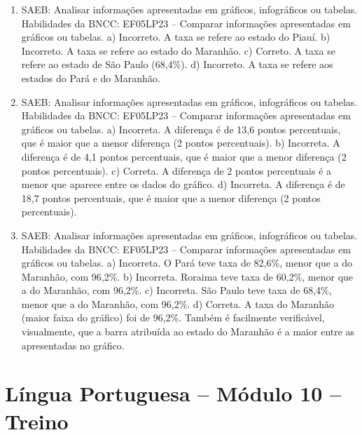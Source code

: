 \begin{enumerate}
\item
SAEB: Analisar informações apresentadas em gráficos,
infográficos ou tabelas. Habilidades da BNCC: EF05LP23 – Comparar
informações apresentadas em gráficos ou tabelas.
a) Incorreto. A taxa se refere ao estado do Piauí.
b) Incorreto. A taxa se refere ao estado do Maranhão.
c) Correto. A taxa se refere ao estado de São Paulo (68,4\%).
d) Incorreto. A taxa se refere aos estados do Pará e do Maranhão.

\item
SAEB: Analisar informações apresentadas em gráficos,
infográficos ou tabelas. Habilidades da BNCC: EF05LP23 – Comparar
informações apresentadas em gráficos ou tabelas.
a) Incorreta. A diferença é de 13,6 pontos percentuais, que é maior que a menor diferença (2 pontos percentuais).
b) Incorreta. A diferença é de 4,1 pontos percentuais, que é maior que a menor diferença (2 pontos percentuais).
c) Correta. A diferença de 2 pontos percentuais é a menor que aparece entre os dados do gráfico.
d) Incorreta. A diferença é de 18,7 pontos percentuais, que é maior que a menor diferença (2 pontos percentuais).

\item
SAEB: Analisar informações apresentadas em gráficos,
infográficos ou tabelas. Habilidades da BNCC: EF05LP23 – Comparar
informações apresentadas em gráficos ou tabelas.
a) Incorreta. O Pará teve taxa de 82,6\%, menor que a do Maranhão, com
96,2\%.
b) Incorreta. Roraima teve taxa de 60,2\%, menor que a do Maranhão, com
96,2\%.
c) Incorreta. São Paulo teve taxa de 68,4\%, menor que a do Maranhão, com
96,2\%.
d) Correta. A taxa do Maranhão (maior faixa do gráfico) foi de 96,2\%. Também é facilmente verificável, visualmente, que a barra atribuída ao estado do Maranhão é a maior entre as apresentadas no gráfico.
\end{enumerate}

\section*{Língua Portuguesa – Módulo 10 – Treino}

